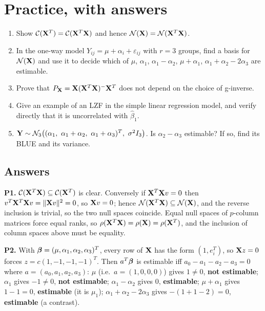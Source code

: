 \documentclass[11pt]{article}
\begin{document}
\section{Practice, with answers}

\begin{enumerate}[label=\textbf{P\arabic*.}]
\item Show $\mathcal{C}(\mathbf{X}^T)=\mathcal{C}(\mathbf{X}^T\mathbf{X})$ and hence $\mathcal{N}(\mathbf{X})=\mathcal{N}(\mathbf{X}^T\mathbf{X})$.

\item In the one-way model $Y_{ij}=\mu+\alpha_i+\varepsilon_{ij}$ with $r=3$ groups, find a
      basis for $\mathcal{N}(\mathbf{X})$ and use it to decide which of
      $\mu$, $\alpha_1$, $\alpha_1-\alpha_2$, $\mu+\alpha_1$, $\alpha_1+\alpha_2-2\alpha_3$
      are estimable.

\item Prove that $P_{\mathbf{X}}=\mathbf{X}(\mathbf{X}^T\mathbf{X})^-\mathbf{X}^T$ does not depend on the choice of g-inverse.

\item Give an example of an LZF in the simple linear regression model, and verify directly
      that it is uncorrelated with $\hat\beta_1$.

\item $\bY\sim\N_3\big((\alpha_1,\ \alpha_1+\alpha_2,\ \alpha_1+\alpha_3)^T,\ \sigma^2I_3\big)$.
      Is $\alpha_2-\alpha_3$ estimable? If so, find its BLUE and its variance.
\end{enumerate}

\subsection*{Answers}

\noindent\textbf{P1.} $\mathcal{C}(\mathbf{X}^T\mathbf{X})\subseteq\mathcal{C}(\mathbf{X}^T)$ is clear. Conversely if
$\mathbf{X}^T\mathbf{X} v=0$ then $v^T\mathbf{X}^T\mathbf{X} v=\|\mathbf{X} v\|^2=0$, so $\mathbf{X} v=0$; hence
$\mathcal{N}(\mathbf{X}^T\mathbf{X})\subseteq\mathcal{N}(\mathbf{X})$, and the reverse inclusion is trivial, so the
two null spaces coincide. Equal null spaces of $p$-column matrices force equal ranks, so
$\rho(\mathbf{X}^T\mathbf{X})=\rho(\mathbf{X})=\rho(\mathbf{X}^T)$, and the inclusion of column spaces above must be
equality.

\smallskip\noindent\textbf{P2.} With $\boldsymbol{\beta}=(\mu,\alpha_1,\alpha_2,\alpha_3)^T$, every row of
$\mathbf{X}$ has the form $(1,e_i^T)$, so $\mathbf{X} z=0$ forces $z=c(1,-1,-1,-1)^T$. Then $a^T\boldsymbol{\beta}$ is
estimable iff $a_0-a_1-a_2-a_3=0$ where $a=(a_0,a_1,a_2,a_3)$:
$\mu$ (i.e.\ $a=(1,0,0,0)$) gives $1\ne0$, \textbf{not estimable};
$\alpha_1$ gives $-1\ne0$, \textbf{not estimable};
$\alpha_1-\alpha_2$ gives $0$, \textbf{estimable};
$\mu+\alpha_1$ gives $1-1=0$, \textbf{estimable} (it is $\mu_1$);
$\alpha_1+\alpha_2-2\alpha_3$ gives $-(1+1-2)=0$, \textbf{estimable} (a contrast).
\end{document}
